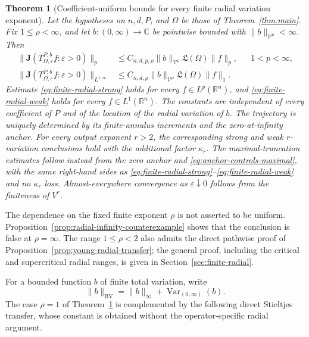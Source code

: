 \documentclass[11pt]{article}
\numberwithin{equation}{section}
\newtheorem{theorem}{Theorem}[section]
\theoremstyle{remark}
\theoremstyle{definition}
\newcommand{\Var}{\operatorname{Var}}
\newcommand{\norm}[1]{\lVert #1\rVert}
\newcommand{\BV}{\operatorname{BV}}
\begin{document}
\begin{theorem}[Coefficient-uniform bounds for every finite radial variation exponent]
\label{thm:finite-radial}
Let the hypotheses on $n,d,P$, and $\Omega$ be those of
Theorem~\ref{thm:main}.  Fix $1\le\rho<\infty$, and let
$b:(0,\infty)\to\mathbb C$ be pointwise bounded with
$\|b\|_{\mathcal V^\rho}<\infty$.  Then
\begin{align}
 \|\mathbf J(T^{P,b}_{\Omega,\varepsilon}f:\varepsilon>0)\|_p
 &\le C_{n,d,p,\rho}\|b\|_{\mathcal V^\rho}
       \mathfrak L(\Omega)\|f\|_p,
 &&1<p<\infty,\label{eq:finite-radial-strong}\\
 \|\mathbf J(T^{P,b}_{\Omega,\varepsilon}f:\varepsilon>0)\|_{L^{1,\infty}}
 &\le C_{n,d,\rho}\|b\|_{\mathcal V^\rho}
       \mathfrak L(\Omega)\|f\|_1.
 \label{eq:finite-radial-weak}
\end{align}
Estimate \eqref{eq:finite-radial-strong} holds for every
$f\in L^p(\mathbb R^n)$, and \eqref{eq:finite-radial-weak} holds for every
$f\in L^1(\mathbb R^n)$.  The constants are independent of every
coefficient of $P$ and of the location of the radial variation of $b$.
The trajectory is uniquely determined by its finite-annulus increments
and the zero-at-infinity anchor.  For every output exponent $r>2$, the
corresponding strong and weak $r$-variation conclusions hold with the
additional factor $\kappa_r$.  The maximal-truncation estimates follow
instead from the zero anchor and \eqref{eq:anchor-controls-maximal}, with
the same right-hand sides as
\eqref{eq:finite-radial-strong}--\eqref{eq:finite-radial-weak} and no
$\kappa_r$ loss.  Almost-everywhere convergence as
$\varepsilon\downarrow0$ follows from the finiteness of $V^r$.
\end{theorem}

The dependence on the fixed finite exponent $\rho$ is not asserted to be
uniform.  Proposition~\ref{prop:radial-infinity-counterexample} shows that
the conclusion is false at $\rho=\infty$.  The range $1\le\rho<2$ also
admits the direct pathwise proof of
Proposition~\ref{prop:young-radial-transfer}; the general proof, including
the critical and supercritical radial ranges, is given in
Section~\ref{sec:finite-radial}.

For a bounded function $b$ of finite total variation, write
\[
 \norm b_{\BV}=\norm b_\infty+\Var_{(0,\infty)}(b).
\]
The case $\rho=1$ of Theorem~\ref{thm:finite-radial} is complemented by the
following direct Stieltjes transfer, whose constant is obtained without the
operator-specific radial argument.
\end{document}
